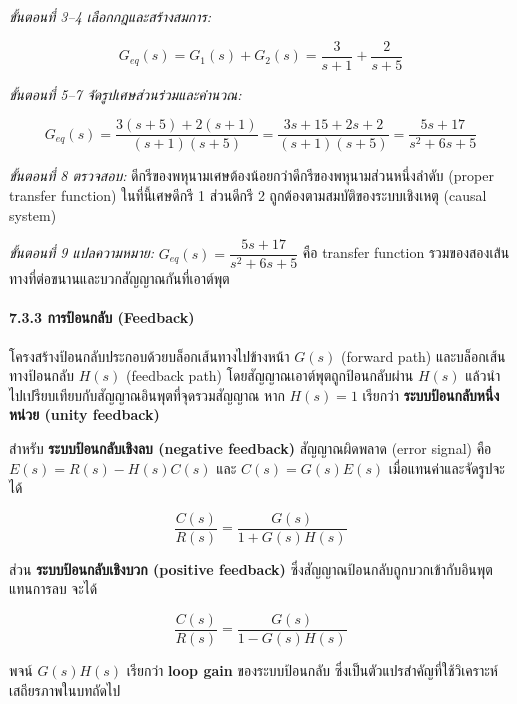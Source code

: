 \textit{ขั้นตอนที่ 3–4 เลือกกฎและสร้างสมการ:}

\[
G_{eq}(s) = G_1(s) + G_2(s) = \frac{3}{s+1} + \frac{2}{s+5}
\]

\textit{ขั้นตอนที่ 5–7 จัดรูปเศษส่วนร่วมและคำนวณ:}

\[
G_{eq}(s) = \frac{3(s+5) + 2(s+1)}{(s+1)(s+5)} = \frac{3s+15+2s+2}{(s+1)(s+5)} = \frac{5s+17}{s^2+6s+5}
\]

\textit{ขั้นตอนที่ 8 ตรวจสอบ:} ดีกรีของพหุนามเศษต้องน้อยกว่าดีกรีของพหุนามส่วนหนึ่งลำดับ (proper transfer function) ในที่นี้เศษดีกรี 1 ส่วนดีกรี 2 ถูกต้องตามสมบัติของระบบเชิงเหตุ (causal system)

\textit{ขั้นตอนที่ 9 แปลความหมาย:} $G_{eq}(s) = \dfrac{5s+17}{s^2+6s+5}$ คือ transfer function รวมของสองเส้นทางที่ต่อขนานและบวกสัญญาณกันที่เอาต์พุต

\paragraph{7.3.3 การป้อนกลับ (Feedback)}

โครงสร้างป้อนกลับประกอบด้วยบล็อกเส้นทางไปข้างหน้า $G(s)$ (forward path) และบล็อกเส้นทางป้อนกลับ $H(s)$ (feedback path) โดยสัญญาณเอาต์พุตถูกป้อนกลับผ่าน $H(s)$ แล้วนำไปเปรียบเทียบกับสัญญาณอินพุตที่จุดรวมสัญญาณ หาก $H(s)=1$ เรียกว่า \textbf{ระบบป้อนกลับหนึ่งหน่วย (unity feedback)}

สำหรับ \textbf{ระบบป้อนกลับเชิงลบ (negative feedback)} สัญญาณผิดพลาด (error signal) คือ $E(s) = R(s) - H(s)C(s)$ และ $C(s) = G(s)E(s)$ เมื่อแทนค่าและจัดรูปจะได้

\[
\frac{C(s)}{R(s)} = \frac{G(s)}{1 + G(s)H(s)}
\]

ส่วน \textbf{ระบบป้อนกลับเชิงบวก (positive feedback)} ซึ่งสัญญาณป้อนกลับถูกบวกเข้ากับอินพุตแทนการลบ จะได้

\[
\frac{C(s)}{R(s)} = \frac{G(s)}{1 - G(s)H(s)}
\]

พจน์ $G(s)H(s)$ เรียกว่า \textbf{loop gain} ของระบบป้อนกลับ ซึ่งเป็นตัวแปรสำคัญที่ใช้วิเคราะห์เสถียรภาพในบทถัดไป

